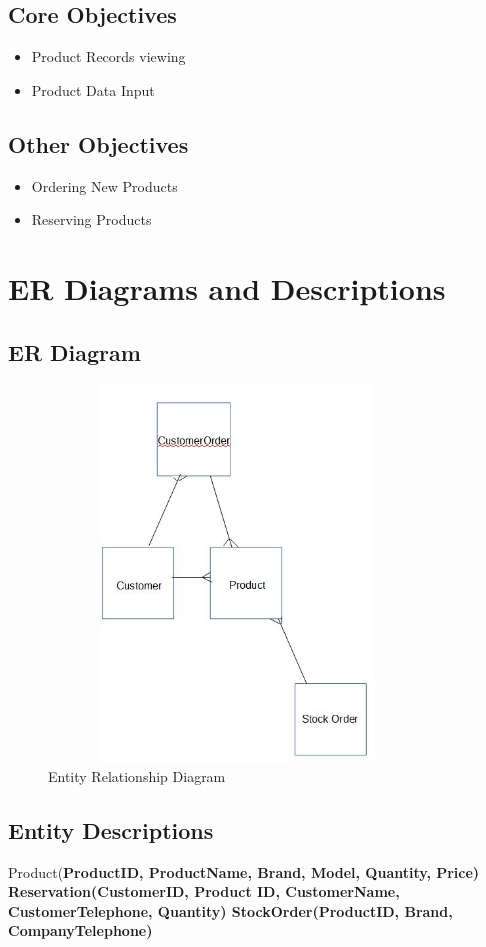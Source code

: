 \subsection{Core Objectives}
\begin{itemize}
	\item Product Records viewing
	\item Product Data Input
\end{itemize}
\subsection{Other Objectives}
\begin{itemize}
	\item Ordering New Products
	\item Reserving Products
\end{itemize}
\section{ER Diagrams and Descriptions}

\subsection{ER Diagram}
\begin{figure}[H]
	\centering
	\includegraphics[width= 10cm, height = 10cm]{Analysis/images/ER_Diagram.JPG}
	\caption {Entity Relationship Diagram} \label{fig:ER_Diagram}
\end{figure}
\subsection{Entity Descriptions}
Product(\bf ProductID, ProductName, Brand, Model, Quantity, Price)
Reservation(\bf CustomerID, \bf Product ID, CustomerName, CustomerTelephone, Quantity)
StockOrder(\bf ProductID, Brand, CompanyTelephone)
